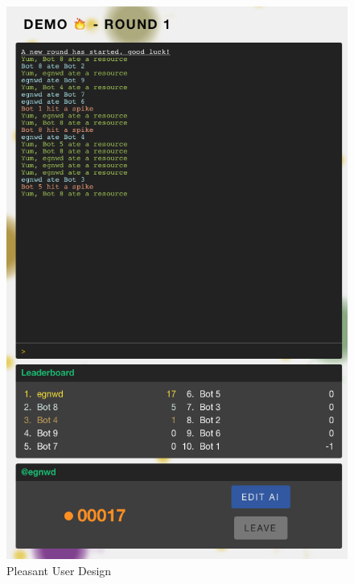\documentclass[a4paper, 6pt]{article}
\begin{document}
\begin{figure}[ht!]
\includegraphics[width=\linewidth]{userPanel_03.png}
\caption{Pleasant User Design}
\endminipage\hfill
\end{figure}
\end{document}
